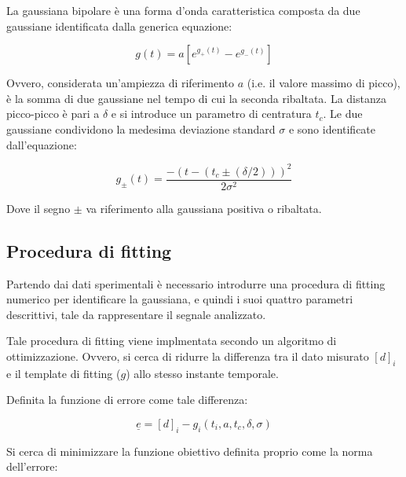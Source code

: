 \begin{figure}
		\centering
		\footnotesize{ \def\svgwidth{0.95\linewidth}
			}
	\caption{}
	\label{fig:gaussiana}
\end{figure}


La gaussiana bipolare è una forma d'onda caratteristica composta da due gaussiane identificata dalla generica equazione:

\begin{equation}
	g(t)=a\left[e^{g_{+}(t)}-e^{g_{-}(t)}\right]
	\label{eq:gaussianabipolare}
\end{equation}

Ovvero, considerata un'ampiezza di riferimento $a$ (i.e. il valore massimo di picco), è la somma di due gaussiane nel tempo di cui la seconda ribaltata. La distanza picco-picco è pari a $\delta$ e si introduce un parametro di centratura $t_c$. Le due gaussiane condividono la medesima deviazione standard $\sigma$ e sono identificate dall'equazione:

\begin{equation}
	g_{\pm}(t)=\frac{-\left(t-\left(t_{c} \pm(\delta / 2)\right)\right)^{2}}{2 \sigma^{2}}
\end{equation}

Dove il segno $\pm$ va riferimento alla gaussiana positiva o ribaltata.

\subsection{Procedura di fitting}

Partendo dai dati sperimentali è necessario introdurre una procedura di fitting numerico per identificare la gaussiana, e quindi i suoi quattro parametri descrittivi, tale da rappresentare il segnale analizzato.

Tale procedura di fitting viene implmentata secondo un algoritmo di ottimizzazione. Ovvero, si cerca di ridurre la differenza tra il dato misurato $[d]_i$ e il template di fitting ($g$) allo stesso instante temporale. 

Definita la funzione di errore come tale differenza:

\begin{equation}
	\underline{e}=[d]_{i}-g_{i}\left(t_{i}, a,t_c,\delta,\sigma\right)
\end{equation}

Si cerca di minimizzare la funzione obiettivo definita proprio come la norma dell'errore:

